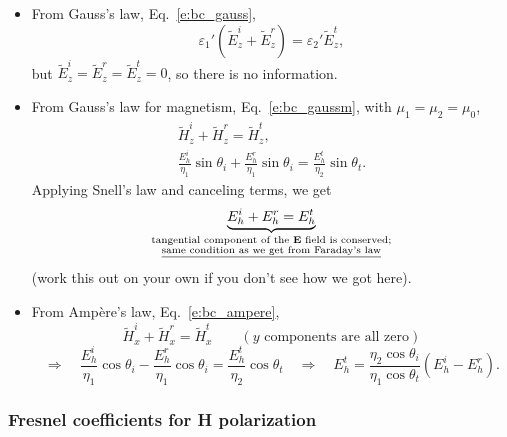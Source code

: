 \documentclass[11pt, oneside]{article}
\begin{document}
\begin{itemize}
	\item From Gauss's law, Eq.~\eqref{e:bc_gauss},
	\begin{equation}
		\varepsilon_1'\left(\tilde{E}^i_z + \tilde{E}^r_z\right) = \varepsilon_2'\tilde{E}^t_z,
	\end{equation}
	but $\tilde{E}^i_z = \tilde{E}^r_z = \tilde{E}^t_z = 0$, so there is no information.
	\item From Gauss's law for magnetism, Eq.~\eqref{e:bc_gaussm}, with $\mu_1 = \mu_2 = \mu_0$,
	\begin{gather}
		\tilde{H}^i_z + \tilde{H}^r_z = \tilde{H}^t_z, \\
		\frac{E_h^i}{\eta_1}\sin\theta_i + \frac{E_h^r}{\eta_1}\sin\theta_i = \frac{E_h^t}{\eta_2}\sin\theta_t.
	\end{gather}
	Applying Snell's law and canceling terms, we get
	\begin{equation}
		\underbrace{E_h^i + E_h^r = E_h^t}_{\substack{\text{tangential component of the $\mathbf{E}$ field is conserved;}\\ \text{\underline{same condition as we get from Faraday's law}}}}
	\end{equation}
	(work this out on your own if you don't see how we got here).
	\item From Amp\`ere's law, Eq.~\eqref{e:bc_ampere},
	\begin{equation}
		\tilde{H}^i_x + \tilde{H}^r_x = \tilde{H}^t_x \qquad (y \text{ components are all zero})
	\end{equation}
	\begin{equation}
		\Rightarrow\quad \frac{E_h^i}{\eta_1}\cos\theta_i - \frac{E_h^r}{\eta_1}\cos\theta_i = \frac{E_h^t}{\eta_2}\cos\theta_t
		\quad\Rightarrow\quad
		E_h^t = \frac{\eta_2\cos\theta_i}{\eta_1\cos\theta_t}\left(E_h^i - E_h^r\right).
	\end{equation}
\end{itemize}

\subsubsection{Fresnel coefficients for H polarization}
\end{document}
